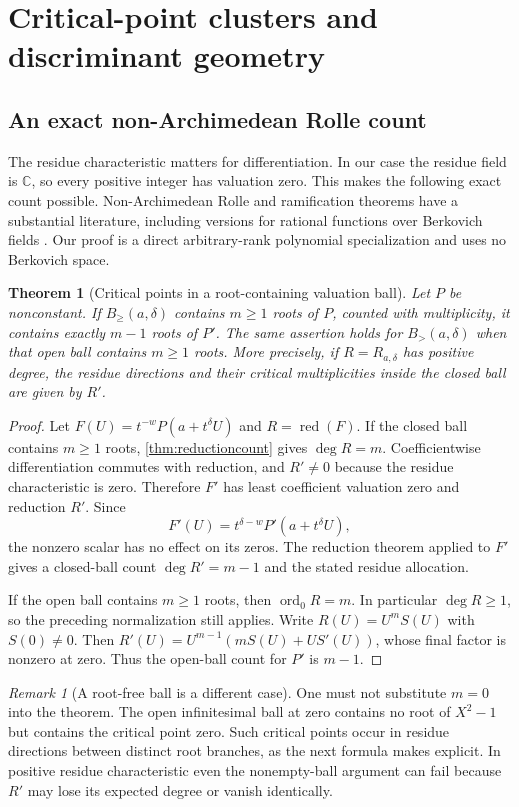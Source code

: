 \documentclass[11pt,letterpaper]{article}
\numberwithin{equation}{section}
\newtheorem{theorem}{Theorem}[section]
\theoremstyle{definition}
\theoremstyle{remark}
\newtheorem{remark}[remark]{Remark}
\newcommand{\C}{\mathbb C}
\newcommand{\red}{\operatorname{red}}
\newcommand{\ord}{\operatorname{ord}}
\newcommand{\Bge}[2]{B_{\ge}(#1,#2)}
\newcommand{\Bgt}[2]{B_{>}(#1,#2)}
\begin{document}
\section{Critical-point clusters and discriminant geometry}\label{sec:critical}

\subsection{An exact non-Archimedean Rolle count}
The residue characteristic matters for differentiation. In our case the
residue field is $\C$, so every positive integer has valuation zero. This
makes the following exact count possible. Non-Archimedean Rolle and
ramification theorems have a substantial literature, including versions
for rational functions over Berkovich fields \cite{Faber}. Our proof is a
direct arbitrary-rank polynomial specialization and uses no Berkovich
space.

\begin{theorem}[Critical points in a root-containing valuation ball]\label{thm:criticalballs}
Let $P$ be nonconstant. If $\Bge{a}{\delta}$ contains $m\ge1$ roots of $P$,
counted with multiplicity, it contains exactly $m-1$ roots of $P'$.
The same assertion holds for $\Bgt{a}{\delta}$ when that open ball contains
$m\ge1$ roots. More precisely, if $R=R_{a,\delta}$ has positive degree,
the residue directions and their critical multiplicities inside the
closed ball are given by $R'$.
\end{theorem}
\begin{proof}
Let $F(U)=t^{-w}P(a+t^\delta U)$ and $R=\red(F)$. If the closed ball
contains $m\ge1$ roots, \cref{thm:reductioncount} gives $\deg R=m$.
Coefficientwise differentiation commutes with reduction, and
$R'\ne0$ because the residue characteristic is zero. Therefore $F'$ has
least coefficient valuation zero and reduction $R'$. Since
\[
 F'(U)=t^{\delta-w}P'(a+t^\delta U),
\]
the nonzero scalar has no effect on its zeros. The reduction theorem
applied to $F'$ gives a closed-ball count $\deg R'=m-1$ and the stated
residue allocation.

If the open ball contains $m\ge1$ roots, then $\ord_0R=m$. In particular
$\deg R\ge1$, so the preceding normalization still applies.
Write $R(U)=U^mS(U)$ with $S(0)\ne0$. Then
$R'(U)=U^{m-1}(mS(U)+US'(U))$, whose final factor is nonzero at zero.
Thus the open-ball count for $P'$ is $m-1$.
\end{proof}

\begin{remark}[A root-free ball is a different case]
One must not substitute $m=0$ into the theorem. The open infinitesimal
ball at zero contains no root of $X^2-1$ but contains the critical point
zero. Such critical points occur in residue directions between distinct
root branches, as the next formula makes explicit. In positive residue
characteristic even the nonempty-ball argument can fail because $R'$ may
lose its expected degree or vanish identically.
\end{remark}
\end{document}

